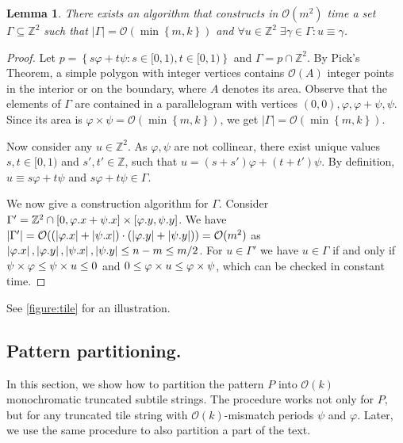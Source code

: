 \documentclass[a4paper,11pt]{article}
\let\Cref\cref
\newtheorem{lemma}{Lemma}[section]
\newcommand{\Z}{\mathbb{Z}}
\renewcommand{\O}{\mathcal{O}}
\renewcommand{\phi}{\varphi}
\newcommand{\set}[1]{\left\lbrace #1 \right\rbrace}
\newcommand{\absolute}[1]{\left\lvert#1\right\rvert}
\newcommand{\jonas}[2][]{\todo[color=green!40, #1]{\textbf{J:} #2}}
\begin{document}
\begin{lemma} \label{lattice_base}
	There exists an algorithm that constructs in $\O(m^2)$ time a set $\Gamma \subseteq \Z^2$ such that $\absolute{\Gamma} = \O(\min\set{m, k})$ and $\forall u \in \Z^2 \; \exists \gamma \in \Gamma : u \equiv \gamma$.
\end{lemma} 
	\begin{proof}
		Let $p = \set{s\phi + t\psi : s \in [0, 1), t \in [0, 1)}$ and $\Gamma = p \cap \Z^2$.
		By Pick's Theorem, a simple polygon with integer vertices contains $\O(A)$ integer points in the interior or on the boundary, where $A$ denotes its area.
		Observe that the elements of $\Gamma$ are contained in a parallelogram with vertices $(0, 0), \phi, \phi + \psi, \psi$.
		Since its area is $\phi \times \psi = \O(\min\set{m, k})$, we get $\absolute{\Gamma} = \O(\min\set{m, k})$.
		
		Now consider any $u \in \Z^2$.
		As $\phi, \psi$ are not collinear, there exist unique values $s, t \in [0, 1)$ and $s', t' \in \Z$, such that
		$u = (s + s') \phi + (t + t') \psi$.
		By definition, 
		$u \equiv s\phi + t\psi$ and $s\phi + t\psi \in \Gamma$.
		
		We now give a construction algorithm for $\Gamma$.
		Consider $\Gamma' = \Z^2 \cap [0,\x{\phi}+\x{\psi}] \times [\y{\phi},\y{\psi}]$.
		We have $\absolute{\Gamma'} = \O((\absolute{\x{\phi}}+\absolute{\x{\psi}}) \cdot (\absolute{\y{\phi}}+\absolute{\y{\psi}})) = \O(m^2)$ as $\absolute{\x{\phi}}, \absolute{\y{\phi}}, \absolute{\x{\psi}}, \absolute{\y{\psi}} \le n - m \le m / 2$.
		For $u \in \Gamma'$ we have $u \in \Gamma$ if and only if $\s{\phi} \le \s{u} \le 0$ and $0 \le \h{u} \le \h{\psi}$, which can be checked in constant time. 
	\end{proof}

\restateDefSubtile

See \Cref{figure:tile} for an illustration.

\restateDefTileString


\subsection{Pattern partitioning.}
\label{sec:partition:pattern}

In this section, we show how to partition the pattern $P$ into $\O(k)$ monochromatic truncated subtile strings. The procedure works not only for $P$, but for any truncated tile string with $\O(k)$-mismatch periods $\psi$ and $\phi$. Later, we use the same procedure to also partition a part of the text.
\end{document}

